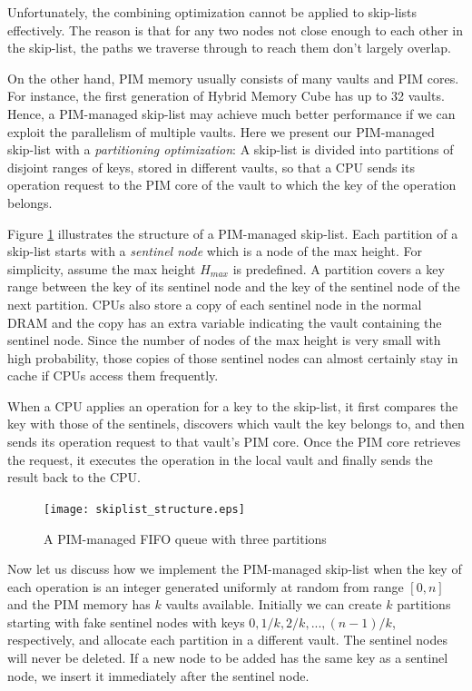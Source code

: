 Unfortunately, the combining optimization cannot be applied to skip-lists effectively.
The reason is that for any two nodes not close enough to each other in the skip-list,
the paths we traverse through to reach them don't largely overlap.

On the other hand, PIM memory usually consists of many vaults and PIM cores.
For instance, the first generation of Hybrid Memory Cube \cite{website:HMC} has up to 32 vaults.
Hence, a PIM-managed skip-list may achieve much better performance if
we can exploit the parallelism of multiple vaults.
Here we present our PIM-managed skip-list with a \textit{partitioning optimization}:
A skip-list is divided into partitions of disjoint ranges of keys,
stored in different vaults, so that a CPU sends its operation request to
the PIM core of the vault to which the key of the operation belongs.

Figure \ref{figure:skiplist_structure} illustrates the structure of a PIM-managed skip-list.
Each partition of a skip-list starts with a \textit{sentinel node}
which is a node of the max height. 
For simplicity, assume the max height $H_{max}$ is predefined.
A partition covers a key range between the key of its sentinel node and
the key of the sentinel node of the next partition.
CPUs also store a copy of each sentinel node in the normal DRAM and 
the copy has an extra variable indicating the vault containing the sentinel node.
Since the number of nodes of the max height is very small with high probability, 
those copies of those sentinel nodes can almost certainly stay in cache
if CPUs access them frequently.

When a CPU applies an operation for a key to the skip-list,
it first compares the key with those of the sentinels, discovers which vault
the key belongs to, and then sends its operation request to that vault's PIM core.
Once the PIM core retrieves the request, it executes the operation in the local vault 
and finally sends the result back to the CPU.


\begin{figure}[ht!]
\centering
\texttt{[image: skiplist\_structure.eps]}
\caption{A PIM-managed FIFO queue with three partitions}
\label{figure:skiplist_structure}
\end{figure}

Now let us discuss how we implement the PIM-managed skip-list
when the key of each operation is an integer generated uniformly at random
from range $[0, n]$ and the PIM memory has $k$ vaults available.
Initially we can create $k$ partitions starting with fake sentinel nodes
with keys $0, 1/k, 2/k,..., (n-1)/k$, respectively, 
and allocate each partition in a different vault. 
The sentinel nodes will never be deleted.
If a new node to be added has the same key as a sentinel node,
we insert it immediately after the sentinel node.

